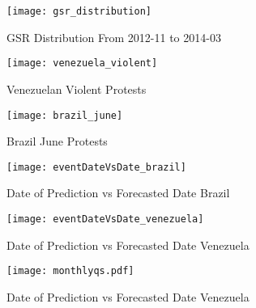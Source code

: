 \begin{figure}
    \texttt{[image: gsr\_distribution]}
    \caption{GSR Distribution From 2012-11 to 2014-03}
\end{figure}


\begin{figure}
    \texttt{[image: venezuela\_violent]}
    \caption{Venezuelan Violent Protests}
\end{figure}


\begin{figure}
    \texttt{[image: brazil\_june]}
    \caption{Brazil June Protests}
\end{figure}

\begin{figure}
    \texttt{[image: eventDateVsDate\_brazil]}
    \caption{Date of Prediction vs Forecasted Date Brazil}
\end{figure}

\begin{figure}
    \texttt{[image: eventDateVsDate\_venezuela]}
    \caption{Date of Prediction vs Forecasted Date Venezuela}
\end{figure}

\begin{figure}
    \texttt{[image: monthlyqs.pdf]}
    \caption{Date of Prediction vs Forecasted Date Venezuela}
\end{figure}





